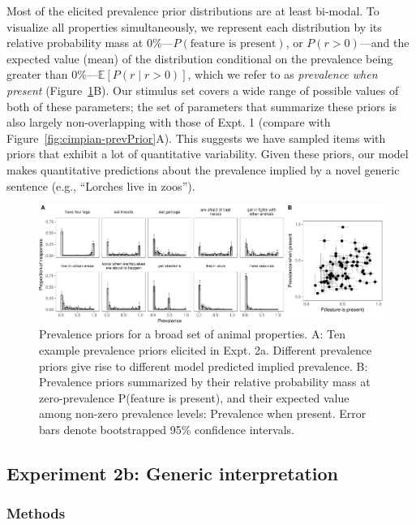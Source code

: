 \documentclass[floatsintext,doc]{apa6}
\theoremstyle{definition}
\theoremstyle{definition}
\theoremstyle{definition}
\theoremstyle{remark}
\begin{document}
Most of the elicited prevalence prior distributions are at least
bi-modal. To visualize all properties simultaneously, we represent each
distribution by its relative probability mass at
0\%---\(P(\text{feature is present})\), or \(P(r > 0)\)---and the
expected value (mean) of the distribution conditional on the prevalence
being greater than 0\%---\(\mathbb{E}[P(r \mid r>0)]\), which we refer
to as \emph{prevalence when present}
(Figure~\ref{fig:genInt-prevPrior}B). Our stimulus set covers a wide
range of possible values of both of these parameters; the set of
parameters that summarize these priors is also largely non-overlapping
with those of Expt. 1 (compare with
Figure~\ref{fig:cimpian-prevPrior}A). This suggests we have sampled
items with priors that exhibit a lot of quantitative variability. Given
these priors, our model makes quantitative predictions about the
prevalence implied by a novel generic sentence (e.g., \enquote{Lorches
live in zoos}).

\begin{figure}
\centering
\includegraphics{genint_files/figure-latex/genInt-prevPrior-1.pdf}
\caption{\label{fig:genInt-prevPrior}Prevalence priors for a broad set of
animal properties. A: Ten example prevalence priors elicited in Expt.
2a. Different prevalence priors give rise to different model predicted
implied prevalence. B: Prevalence priors summarized by their relative
probability mass at zero-prevalence P(feature is present), and their
expected value among non-zero prevalence levels: Prevalence when
present. Error bars denote bootstrapped 95\% confidence intervals.}
\end{figure}

\subsection{Experiment 2b: Generic
interpretation}\label{experiment-2b-generic-interpretation}

\subsubsection{Methods}\label{methods-1}
\end{document}
